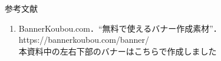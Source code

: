 \begin{frame}{参考文献}
  \begin{enumerate}[label=\textbf{［\arabic*］},itemsep=1ex, leftmargin=1cm]
    \item BannerKoubou.com．“無料で使えるバナー作成素材”．https://bannerkoubou.com/banner/ \\
          本資料中の左右下部のバナーはこちらで作成しました
  \end{enumerate}
\end{frame}
